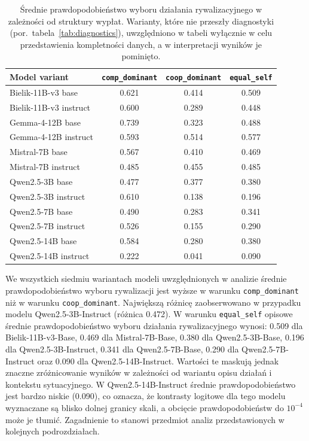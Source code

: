 \documentclass[11pt]{article}
\newcommand{\equalself}{\texttt{equal\_self}}
\begin{document}
\begin{table}[H]
\centering
\small
\caption{Średnie prawdopodobieństwo wyboru działania rywalizacyjnego w zależności od struktury wypłat. Warianty, które nie przeszły diagnostyki (por.\ tabela~\ref{tab:diagnostics}), uwzględniono w tabeli wyłącznie w celu przedstawienia kompletności danych, a w interpretacji wyników je pominięto.}
\begin{tabular}{lccc}
\toprule
Model variant & \texttt{comp\_dominant} & \texttt{coop\_dominant} & \texttt{equal\_self} \\
\midrule
Bielik-11B-v3 base      & 0.621 & 0.414 & 0.509 \\
Bielik-11B-v3 instruct  & 0.600 & 0.289 & 0.448 \\
Gemma-4-12B base        & 0.739 & 0.323 & 0.488 \\
Gemma-4-12B instruct    & 0.593 & 0.514 & 0.577 \\
Mistral-7B base         & 0.567 & 0.410 & 0.469 \\
Mistral-7B instruct     & 0.485 & 0.455 & 0.485 \\
Qwen2.5-3B base         & 0.477 & 0.377 & 0.380 \\
Qwen2.5-3B instruct     & 0.610 & 0.138 & 0.196 \\
Qwen2.5-7B base         & 0.490 & 0.283 & 0.341 \\
Qwen2.5-7B instruct     & 0.526 & 0.155 & 0.290 \\
Qwen2.5-14B base        & 0.584 & 0.280 & 0.380 \\
Qwen2.5-14B instruct    & 0.222 & 0.041 & 0.090 \\
\bottomrule
\end{tabular}
\label{tab:payoffmeans}
\end{table}

We wszystkich siedmiu wariantach modeli uwzględnionych w analizie średnie prawdopodobieństwo wyboru rywalizacji jest wyższe w warunku \texttt{comp\_dominant} niż w warunku \texttt{coop\_dominant}. Największą różnicę zaobserwowano w przypadku modelu Qwen2.5-3B-Instruct (różnica 0.472).
W warunku \equalself{} opisowe średnie prawdopodobieństwo wyboru działania rywalizacyjnego wynosi: 0.509 dla Bielik-11B-v3-Base, 0.469 dla Mistral-7B-Base, 0.380 dla Qwen2.5-3B-Base, 0.196 dla Qwen2.5-3B-Instruct, 0.341 dla Qwen2.5-7B-Base, 0.290 dla Qwen2.5-7B-Instruct oraz 0.090 dla Qwen2.5-14B-Instruct.
Wartości te maskują jednak znaczne zróżnicowanie wyników w zależności od wariantu opisu działań i kontekstu sytuacyjnego. W Qwen2.5-14B-Instruct średnie prawdopodobieństwo jest bardzo niskie (0.090), co oznacza, że kontrasty logitowe dla tego modelu wyznaczane są blisko dolnej granicy skali, a obcięcie prawdopodobieństw do $10^{-4}$ może je tłumić. Zagadnienie to stanowi przedmiot analiz przedstawionych w kolejnych podrozdziałach.
\end{document}
